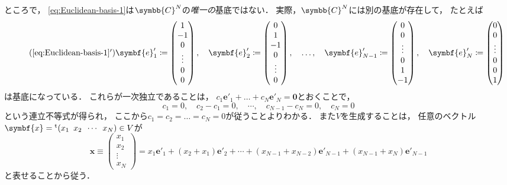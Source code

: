 \documentclass[
]{sotsu}
\begin{document}
ところで，
\cref{eq:Euclidean-basis-1}は$\symbb{C}^N$の\emph{唯一の}基底ではない．
実際，$\symbb{C}^N$には別の基底が存在して，
たとえば
\begin{equation}
    \tag{\ref*{eq:Euclidean-basis-1}$'$}
    \label{eq:Euclidean-basis-2}
    \symbf{e}'_1 \coloneq
    \begin{pmatrix}
        1  \\  -1  \\  0  \\  \vdots  \\  0  \\  0
    \end{pmatrix}
    , \quad
    \symbf{e}'_2 \coloneq
    \begin{pmatrix}
        0  \\  1  \\  -1  \\  0  \\  \vdots  \\  0
    \end{pmatrix}
    , \quad \dotsc, \quad
    \symbf{e}'_{N-1} \coloneq
    \begin{pmatrix}
        0  \\  0  \\  \vdots  \\  0  \\  1  \\  -1
    \end{pmatrix}
    , \quad
    \symbf{e}'_N \coloneq
    \begin{pmatrix}
        0  \\  0  \\  \vdots  \\  0  \\  0  \\  1
    \end{pmatrix}
\end{equation}
は基底になっている．
これらが一次独立であることは，
$c_1 \symbf{e}'_1 + \dots + c_N \symbf{e}'_N = \symbf{0}$とおくことで，
\begin{equation*}
    c_1 = 0, 
    \quad 
    c_2 - c_1 = 0, 
    \quad
    \dotsb,
    \quad 
    c_{N-1} - c_N = 0,
    \quad
    c_N = 0
\end{equation*}
という連立不等式が得られ，
ここから$c_1 = c_2 = \dots = c_N = 0$が従うことよりわかる．
また$V$を生成することは，
任意のベクトル$\symbf{x} = \cvector{x_1 ; x_2 ; \cdots ; x_N} \in V$が
\begin{equation*}
    \symbf{x} \equiv 
    \begin{pmatrix}
        x_1  \\  x_2  \\  \vdots  \\  x_N
    \end{pmatrix}
    =
      x_1 \symbf{e}'_1
    + (x_2 + x_1) \symbf{e}'_2
    + \dotsb 
    + (x_{N-1} + x_{N-2}) \symbf{e}'_{N-1}
    + (x_{N-1} + x_N) \symbf{e}'_{N-1}
\end{equation*}
と表せることから従う．
\end{document}
